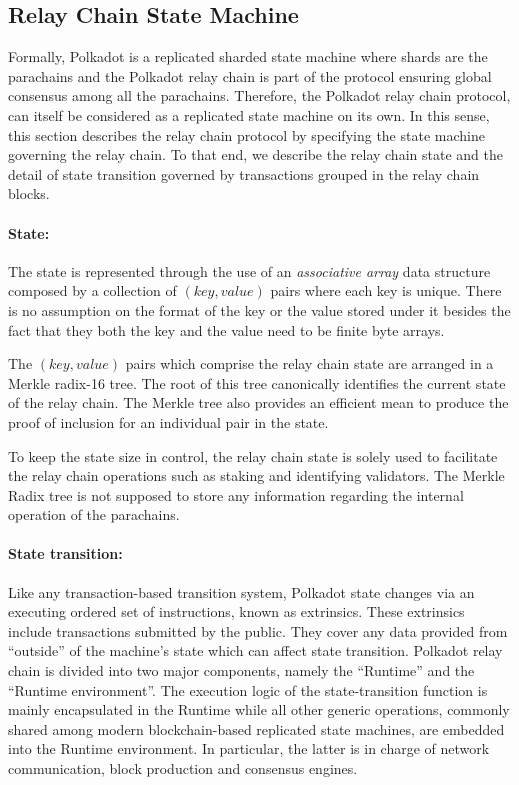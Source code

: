 \subsection{Relay Chain State Machine}\label{sec:relaychain}

Formally, Polkadot is a replicated sharded state machine where shards are the parachains and the Polkadot relay chain is part of the protocol ensuring global consensus among all the parachains. Therefore, the Polkadot relay chain protocol, can itself be considered as a replicated state machine on its own. In this sense, this section describes the relay chain protocol by specifying the state machine governing the relay chain. To that end, we describe the relay chain state and the detail of state transition governed by transactions grouped in the relay chain blocks.

\paragraph{State:} The state is represented through the use of an \emph{associative array} data structure composed by a collection of $(key, value)$ pairs where each key is unique. There is no assumption on the format of the key or the value stored under it besides the fact that they both the key and the value need to be finite byte arrays.

The $(key, value)$ pairs which comprise the relay chain state are arranged in a Merkle radix-16 tree. The root of this tree canonically identifies the current state of the relay chain. The Merkle tree also provides an efficient mean to produce the  proof of inclusion for an individual pair in the state.

To keep the state size in control, the relay chain state is solely used to facilitate the relay chain operations such as staking and identifying validators. The Merkle Radix tree is not supposed to store any information regarding the internal operation of the parachains.

\paragraph{State transition: } \label{par:state_transition} Like any transaction-based transition system, Polkadot state changes via an executing ordered set of instructions, known as extrinsics. These extrinsics include transactions submitted by the public. They cover any data provided from ``outside'' of the machine's state which can affect state transition. Polkadot relay chain is divided into two major components, namely the ``Runtime'' and the ``Runtime environment''. The execution logic of the state-transition function is mainly encapsulated in the Runtime while all other generic operations, commonly shared among modern blockchain-based replicated state machines, are embedded into the Runtime environment. In particular, the latter is in charge of network communication, block production and consensus engines.

